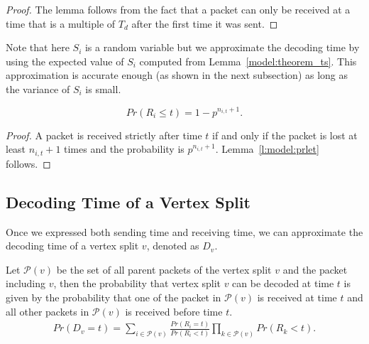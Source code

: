     \begin{proof}
    The lemma follows from the fact that a packet can only be
    received at a time that is a multiple of $T_d$ after the
    first time it was sent. %
    \end{proof}

    Note that here $S_i$ is a random variable but we approximate
    the decoding time by using the expected value of $S_i$ computed
    from Lemma~\ref{model:theorem_ts}.  This approximation is accurate
    enough (as shown in the next subsection) as long as the variance
    of $S_i$ is small.

\begin{lemma}
\label{l:model:prlet}
\begin{equation*}
Pr(R_i \leq t) = 1 - p^{n_{i,t}+1}.
\end{equation*}
\end{lemma}

    \begin{proof}
    A packet is received strictly after time $t$ if and only if the packet
    is lost at least $n_{i,t}+1$ times and the probability is
    $p^{n_{i,t}+1}$. 
    Lemma~\ref{l:model:prlet} follows. %
    \end{proof}

\subsection{Decoding Time of a Vertex Split}

    Once we expressed both sending time and receiving time,
    we can approximate the decoding time of a vertex split $v$, denoted
    as $D_v$.

    Let $\mathcal{P}(v)$ be the set of
    all parent packets of the vertex split $v$ and the packet including $v$, then the
    probability that vertex split $v$ can be decoded at time $t$
    is given by the probability that one of the packet in $\mathcal{P}(v)$
    is received at time $t$ and all other packets in $\mathcal{P}(v)$
    is received before time $t$.
    \begin{eqnarray}
    \label{e:model:pdvt}
        Pr(D_v = t) = \sum_{i \in \mathcal{P}(v)} \frac{Pr(R_i = t)}{Pr(R_i < t)} \prod_{k \in \mathcal{P}(v)} Pr(R_k < t).
    \end{eqnarray}

